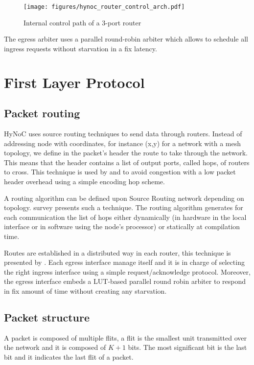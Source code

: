 \begin{figure}[H]
  \centering
  \texttt{[image: figures/hynoc\_router\_control\_arch.pdf]}
  \caption{Internal control path of a 3-port router}
  \label{hynoc_router_control_arch}
\end{figure}

The egress arbiter uses a parallel round-robin arbiter which allows to schedule all ingress requests without starvation
in a fix latency.

\section{First Layer Protocol}

\subsection{Packet routing}

HyNoC uses source routing techniques to send data through routers. Instead of addressing node with coordinates, for
instance (x,y) for a network with a mesh topology, we define in the packet's header the route to take through the
network. This means that the header contains a list of output ports, called hops, of routers to cross. This technique is
used by \cite{LIW2007} and \cite{MUB2010} to avoid congestion with a low packet header overhead using a simple encoding
hop scheme.

A routing algorithm can be defined upon Source Routing network depending on topology. \cite{MUB2010} survey presents
such a technique. The routing algorithm generates for each communication the list of hops either dynamically (in
hardware in the local interface or in software using the node's processor) or statically at compilation time.

Routes are established in a distributed way in each router, this technique is presented by \cite{PON2011}. Each egress
interface manage itself and it is in charge of selecting the right ingress interface using a simple request/acknowledge
protocol. Moreover, the egress interface embeds a LUT-based parallel round robin arbiter to respond in fix amount of
time without creating any starvation.


\subsection{Packet structure}

A packet is composed of multiple flits, a flit is the smallest unit transmitted over the network and it is composed of
$K+1$ bits. The most significant bit is the last bit and it indicates the last flit of a packet.

